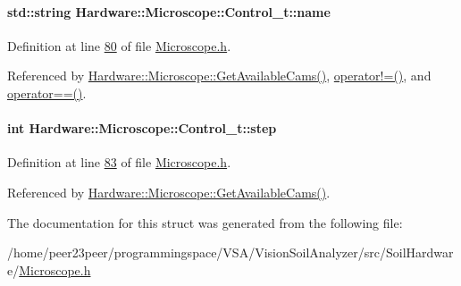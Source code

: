 \hypertarget{struct_hardware_1_1_microscope_1_1_control__t_a7e6d24c2ba366a688ede19b4309dff66}{}
\paragraph[{name}]{\setlength{\rightskip}{0pt plus 5cm}std\+::string Hardware\+::\+Microscope\+::\+Control\+\_\+t\+::name}\label{struct_hardware_1_1_microscope_1_1_control__t_a7e6d24c2ba366a688ede19b4309dff66}


Definition at line \hyperlink{_microscope_8h_source_l00080}{80} of file \hyperlink{_microscope_8h_source}{Microscope.\+h}.



Referenced by \hyperlink{_microscope_8cpp_source_l00047}{Hardware\+::\+Microscope\+::\+Get\+Available\+Cams()}, \hyperlink{_microscope_8h_source_l00094}{operator!=()}, and \hyperlink{_microscope_8h_source_l00087}{operator==()}.

\hypertarget{struct_hardware_1_1_microscope_1_1_control__t_a3151af96b23b2f4d536c74da12d81049}{}
\paragraph[{step}]{\setlength{\rightskip}{0pt plus 5cm}int Hardware\+::\+Microscope\+::\+Control\+\_\+t\+::step}\label{struct_hardware_1_1_microscope_1_1_control__t_a3151af96b23b2f4d536c74da12d81049}


Definition at line \hyperlink{_microscope_8h_source_l00083}{83} of file \hyperlink{_microscope_8h_source}{Microscope.\+h}.



Referenced by \hyperlink{_microscope_8cpp_source_l00047}{Hardware\+::\+Microscope\+::\+Get\+Available\+Cams()}.



The documentation for this struct was generated from the following file\+:\begin{DoxyCompactItemize}
\item 
/home/peer23peer/programmingspace/\+V\+S\+A/\+Vision\+Soil\+Analyzer/src/\+Soil\+Hardware/\hyperlink{_microscope_8h}{Microscope.\+h}\end{DoxyCompactItemize}
